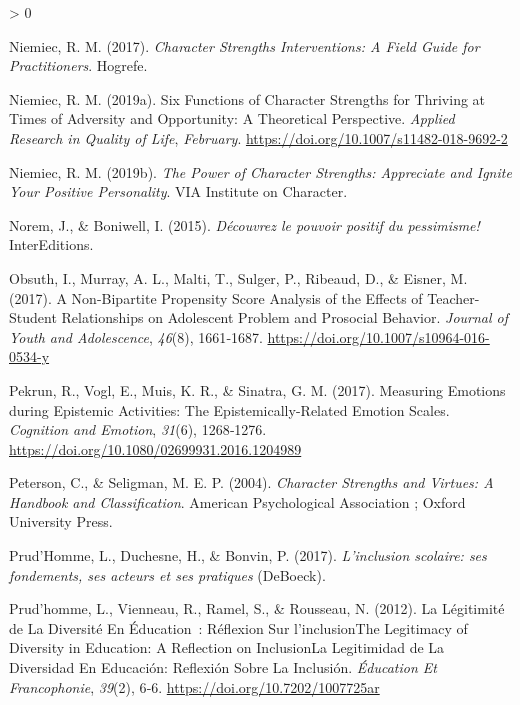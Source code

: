 \documentclass[
  french,
]{article}
\newlength{\cslhangindent}
\newenvironment{CSLReferences}[2] %
 {%
  \setlength{\parindent}{0pt}
  \ifodd #1 \everypar{\setlength{\hangindent}{\cslhangindent}}\ignorespaces\fi
  \ifnum #2 > 0
  \setlength{\parskip}{#2\baselineskip}
  \fi
 }%
 {}
\begin{document}
\begin{CSLReferences}{1}{0}
\leavevmode\hypertarget{ref-niemiec2017b}{}%
Niemiec, R. M. (2017). \emph{Character Strengths Interventions: A Field Guide for Practitioners}. {Hogrefe}.

\leavevmode\hypertarget{ref-niemiec2019}{}%
Niemiec, R. M. (2019a). Six {Functions} of {Character Strengths} for {Thriving} at {Times} of {Adversity} and {Opportunity}: A {Theoretical Perspective}. \emph{Applied Research in Quality of Life}, \emph{February}. \url{https://doi.org/10.1007/s11482-018-9692-2}

\leavevmode\hypertarget{ref-niemiec2019a}{}%
Niemiec, R. M. (2019b). \emph{The {Power} of Character Strengths: Appreciate and Ignite Your Positive Personality}. {VIA Institute on Character}.

\leavevmode\hypertarget{ref-norem2015}{}%
Norem, J., \& Boniwell, I. (2015). \emph{{Découvrez le pouvoir positif du pessimisme!}} {InterEditions}.

\leavevmode\hypertarget{ref-obsuth2017}{}%
Obsuth, I., Murray, A. L., Malti, T., Sulger, P., Ribeaud, D., \& Eisner, M. (2017). A {Non}-Bipartite {Propensity Score Analysis} of the {Effects} of {Teacher}-{Student Relationships} on {Adolescent Problem} and {Prosocial Behavior}. \emph{Journal of Youth and Adolescence}, \emph{46}(8), 1661‑1687. \url{https://doi.org/10.1007/s10964-016-0534-y}

\leavevmode\hypertarget{ref-pekrun2017}{}%
Pekrun, R., Vogl, E., Muis, K. R., \& Sinatra, G. M. (2017). Measuring Emotions during Epistemic Activities: The {Epistemically}-{Related Emotion Scales}. \emph{Cognition and Emotion}, \emph{31}(6), 1268‑1276. \url{https://doi.org/10.1080/02699931.2016.1204989}

\leavevmode\hypertarget{ref-peterson2004}{}%
Peterson, C., \& Seligman, M. E. P. (2004). \emph{Character Strengths and Virtues: A Handbook and Classification}. {American Psychological Association ; Oxford University Press}.

\leavevmode\hypertarget{ref-prudhomme2017}{}%
Prud'Homme, L., Duchesne, H., \& Bonvin, P. (2017). \emph{{L'inclusion scolaire: ses fondements, ses acteurs et ses pratiques}} (DeBoeck).

\leavevmode\hypertarget{ref-prudhomme2012}{}%
Prud'homme, L., Vienneau, R., Ramel, S., \& Rousseau, N. (2012). La Légitimité de La Diversité En Éducation~: Réflexion Sur l'{inclusionThe Legitimacy} of {Diversity} in {Education}: {A Reflection} on {InclusionLa} Legitimidad de La Diversidad En Educación: Reflexión Sobre La Inclusión. \emph{Éducation Et Francophonie}, \emph{39}(2), 6‑6. \url{https://doi.org/10.7202/1007725ar}


\end{CSLReferences}
\end{document}
